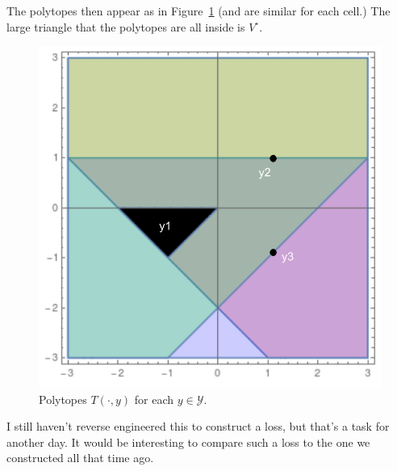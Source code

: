 \documentclass[12pt]{article}
\newcommand{\Y}{\mathcal{Y}}
\begin{document}
The polytopes then appear as in Figure~\ref{fig:ranking-polytopes} (and are similar for each cell.)
The large triangle that the polytopes are all inside is $V^\circ$.
\begin{figure}
\centering
\includegraphics[width=0.7\linewidth]{./ranking}
\caption{Polytopes $T(\cdot, y)$ for each $y \in \Y$.}
\label{fig:ranking-polytopes}
\end{figure}

I still haven't reverse engineered this to construct a loss, but that's a task for another day.
It would be interesting to compare such a loss to the one we constructed all that time ago.
\end{document}

